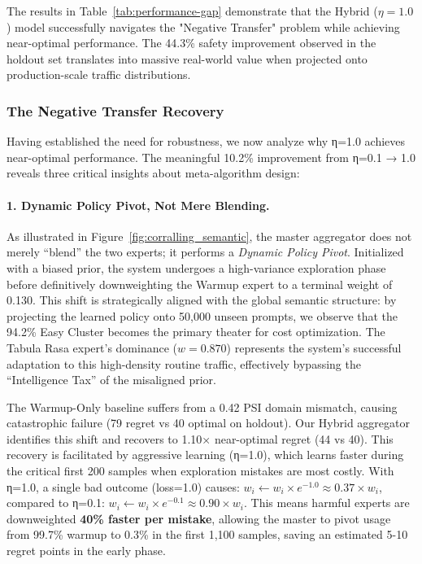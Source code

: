 The results in Table~\ref{tab:performance-gap} demonstrate that the Hybrid ($\eta=1.0$) model successfully navigates the "Negative Transfer" problem while achieving near-optimal performance. The 44.3\% safety improvement observed in the holdout set translates into massive real-world value when projected onto production-scale traffic distributions.

\subsubsection{The Negative Transfer Recovery}

Having established the need for robustness, we now analyze why η=1.0 achieves near-optimal performance. The meaningful 10.2\% improvement from η=0.1 → 1.0 reveals three critical insights about meta-algorithm design:

\paragraph{1. Dynamic Policy Pivot, Not Mere Blending.}
As illustrated in Figure~\ref{fig:corralling_semantic}, the master aggregator does not merely ``blend'' the two experts; it performs a \emph{Dynamic Policy Pivot}. Initialized with a biased prior, the system undergoes a high-variance exploration phase before definitively downweighting the Warmup expert to a terminal weight of 0.130. This shift is strategically aligned with the global semantic structure: by projecting the learned policy onto 50,000 unseen prompts, we observe that the 94.2\% Easy Cluster becomes the primary theater for cost optimization. The Tabula Rasa expert's dominance ($w=0.870$) represents the system's successful adaptation to this high-density routine traffic, effectively bypassing the ``Intelligence Tax'' of the misaligned prior.

The Warmup-Only baseline suffers from a 0.42 PSI domain mismatch, causing catastrophic failure (79 regret vs 40 optimal on holdout). Our Hybrid aggregator identifies this shift and recovers to 1.10× near-optimal regret (44 vs 40). This recovery is facilitated by aggressive learning (η=1.0), which learns faster during the critical first 200 samples when exploration mistakes are most costly. With η=1.0, a single bad outcome (loss=1.0) causes: $w_i \leftarrow w_i \times e^{-1.0} \approx 0.37 \times w_i$, compared to η=0.1: $w_i \leftarrow w_i \times e^{-0.1} \approx 0.90 \times w_i$. This means harmful experts are downweighted \textbf{40\% faster per mistake}, allowing the master to pivot usage from 99.7\% warmup to 0.3\% in the first 1,100 samples, saving an estimated 5-10 regret points in the early phase.

